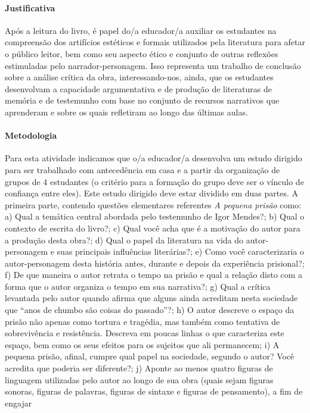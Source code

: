 \documentclass[11pt]{extarticle}
\begin{document}
\paragraph{Justificativa} Após a leitura do livro, é papel do/a educador/a
auxiliar os estudantes na compreensão dos artifícios estéticos e formais
utilizados pela literatura para afetar o público leitor, bem como seu
aspecto ético e conjunto de outras reflexões estimuladas pelo
narrador-personagem. Isso representa um trabalho de conclusão sobre a
análise crítica da obra, interessando-nos, ainda, que os estudantes
desenvolvam a capacidade argumentativa e de produção de literaturas de
memória e de testemunho com base no conjunto de recursos narrativos que
aprenderam e sobre os quais refletiram ao longo das últimas aulas.

\paragraph{Metodologia} Para esta atividade indicamos que o/a educador/a
desenvolva um estudo dirigido para ser trabalhado com antecedência em
casa e a partir da organização de grupos de 4 estudantes (o critério
para a formação do grupo deve ser o vínculo de confiança entre eles).
Este estudo dirigido deve estar dividido em duas partes. A primeira
parte, contendo questões elementares referentes \emph{A pequena prisão}
como: a) Qual a temática central abordada pelo testemunho de Igor
Mendes?; b) Qual o contexto de escrita do livro?; c) Qual você acha que
é a motivação do autor para a produção desta obra?; d) Qual o papel da
literatura na vida do autor-personagem e suas principais influências
literárias?; e) Como você caracterizaria o autor-personagem desta
história antes, durante e depois da experiência prisional?; f) De que
maneira o autor retrata o tempo na prisão e qual a relação disto com a
forma que o autor organiza o tempo em sua narrativa?; g) Qual a crítica
levantada pelo autor quando afirma que alguns ainda acreditam nesta
sociedade que ``anos de chumbo são coisas do passado''?; h) O autor
descreve o espaço da prisão não apenas como tortura e tragédia, mas
também como tentativa de sobrevivência e resistência. Descreva em poucas
linhas o que caracteriza este espaço, bem como os seus efeitos para os
sujeitos que ali permanecem; i) A pequena prisão, afinal, cumpre qual
papel na sociedade, segundo o autor? Você acredita que poderia ser
diferente?; j) Aponte ao menos quatro figuras de linguagem utilizadas
pelo autor ao longo de sua obra (quais sejam figuras sonoras, figuras de
palavras, figuras de sintaxe e figuras de pensamento), a fim de engajar
\end{document}
